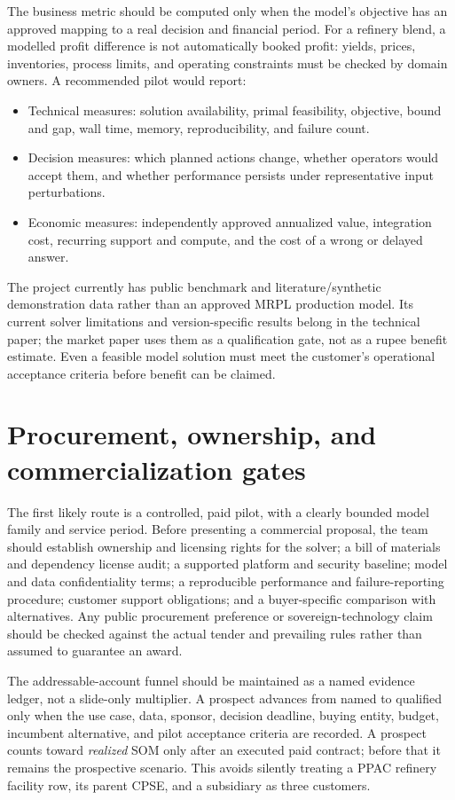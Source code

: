 \documentclass[11pt,a4paper]{article}
\begin{document}
The business metric should be computed only when the model's objective has an approved mapping to a real decision and financial period. For a refinery blend, a modelled profit difference is not automatically booked profit: yields, prices, inventories, process limits, and operating constraints must be checked by domain owners. A recommended pilot would report:
\begin{itemize}
  \item Technical measures: solution availability, primal feasibility, objective, bound and gap, wall time, memory, reproducibility, and failure count.
  \item Decision measures: which planned actions change, whether operators would accept them, and whether performance persists under representative input perturbations.
  \item Economic measures: independently approved annualized value, integration cost, recurring support and compute, and the cost of a wrong or delayed answer.
\end{itemize}

The project currently has public benchmark and literature/synthetic demonstration data rather than an approved MRPL production model. Its current solver limitations and version-specific results belong in the technical paper; the market paper uses them as a qualification gate, not as a rupee benefit estimate. Even a feasible model solution must meet the customer's operational acceptance criteria before benefit can be claimed.

\section{Procurement, ownership, and commercialization gates}

The first likely route is a controlled, paid pilot, with a clearly bounded model family and service period. Before presenting a commercial proposal, the team should establish ownership and licensing rights for the solver; a bill of materials and dependency license audit; a supported platform and security baseline; model and data confidentiality terms; a reproducible performance and failure-reporting procedure; customer support obligations; and a buyer-specific comparison with alternatives. Any public procurement preference or sovereign-technology claim should be checked against the actual tender and prevailing rules rather than assumed to guarantee an award.

The addressable-account funnel should be maintained as a named evidence ledger, not a slide-only multiplier. A prospect advances from named to qualified only when the use case, data, sponsor, decision deadline, buying entity, budget, incumbent alternative, and pilot acceptance criteria are recorded. A prospect counts toward \emph{realized} SOM only after an executed paid contract; before that it remains the prospective scenario. This avoids silently treating a PPAC refinery facility row, its parent CPSE, and a subsidiary as three customers.
\end{document}
